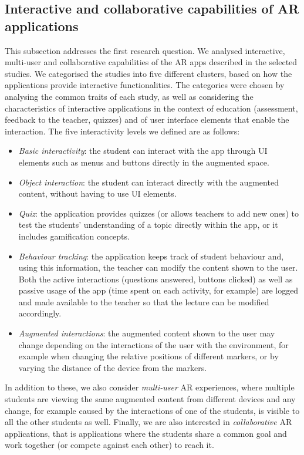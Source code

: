 \subsection{Interactive and collaborative capabilities of AR applications}\label{sec:results:RQ1}

This subsection addresses the first research question. We analysed interactive, multi-user and collaborative capabilities of the \gls{AR} apps described in the selected studies. We categorised the studies into five different clusters, based on how the applications provide interactive functionalities. The categories were chosen by analysing the common traits of each study, as well as considering the characteristics of interactive applications in the context of education (assessment, feedback to the teacher, quizzes) and of user interface elements that enable the interaction.  The five interactivity levels we defined are as follows:

\begin{itemize}
    \item \emph{Basic interactivity}: the student can interact with the app through \gls{UI} elements such as menus and buttons directly in the augmented space.
    \item \emph{Object interaction}: the student can interact directly with the augmented content, without having to use \gls{UI} elements.
    \item \emph{Quiz}: the application provides quizzes (or allows teachers to add new ones) to test the students' understanding of a topic directly within the app, or it includes gamification concepts.
    \item \emph{Behaviour tracking}: the application keeps track of student behaviour and, using this information, the teacher can modify the content shown to the user. Both the active interactions (questions answered, buttons clicked) as well as passive usage of the app (time spent on each activity, for example) are logged and made available to the teacher so that the lecture can be modified accordingly.
    \item \emph{Augmented interactions}: the augmented content shown to the user may change depending on the interactions of the user with the environment, for example when changing the relative positions of different markers, or by varying the distance of the device from the markers.
\end{itemize}

In addition to these, we also consider \emph{multi-user} \gls{AR} experiences, where multiple students are viewing the same augmented content from different devices and any change, for example caused by the interactions of one of the students, is visible to all the other students as well.
Finally, we are also interested in \emph{collaborative} \gls{AR} applications, that is applications where the students share a common goal and work together (or compete against each other) to reach it.

